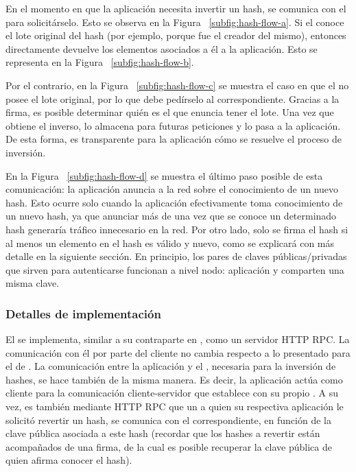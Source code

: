 %
En el momento en que la aplicación necesita invertir un hash, se comunica con el \hcollector
para solicitárselo. Esto se observa en la Figura ~\ref{subfig:hash-flow-a}.
%
Si el \hcollector conoce el lote original del hash (por ejemplo, porque fue el \hcollector creador
del mismo), entonces directamente devuelve los elementos asociados a él a la aplicación.
Esto se representa en la Figura ~\ref{subfig:hash-flow-b}.
%

Por el contrario, en la Figura ~\ref{subfig:hash-flow-c} se muestra el caso en que el \hcollector no posee el lote original,
por lo que debe pedírselo al \hcollector correspondiente. Gracias a la firma, es posible determinar
quién es el \hcollector que enuncia tener el lote. Una vez que obtiene el inverso, lo almacena para
futuras peticiones y lo pasa a la aplicación. De esta forma, es transparente para la aplicación
cómo se resuelve el proceso de inversión.

%

En la Figura ~\ref{subfig:hash-flow-d} se muestra el último paso posible de esta comunicación: la aplicación
anuncia a la red sobre el conocimiento de un nuevo hash. Esto ocurre solo cuando la aplicación
efectivamente toma conocimiento de un nuevo hash, ya que anunciar más de una vez que se conoce un
determinado hash generaría tráfico innecesario en la red.
Por otro lado, solo se firma el hash si al
menos un elemento en el hash es válido y nuevo, como se explicará con más detalle en la siguiente sección.
%
En principio, los pares de claves públicas/privadas que sirven para autenticarse
funcionan a nivel nodo: aplicación y \hcollector comparten una misma clave.

\subsubsection{Detalles de implementación}
El \hcollector se implementa, similar a su contraparte en \compresschain, como un servidor HTTP RPC.
%
La comunicación con él por parte del cliente no cambia respecto a lo presentado para el \collector
de \compresschain.
%
La comunicación entre la aplicación y el \hcollector, necesaria para la inversión de hashes,
se hace también de la misma manera.
Es decir, la aplicación actúa como cliente para la comunicación cliente-servidor que establece con
su propio \hcollector.
%
A su vez, es también mediante HTTP RPC que un \hcollector a quien su respectiva aplicación
le solicitó revertir un hash, se comunica con el \hcollector correspondiente, en función de la clave
pública asociada a este hash (recordar que los hashes a revertir están acompañados de una firma, de la cual
es posible recuperar la clave pública de quien afirma conocer el hash).

